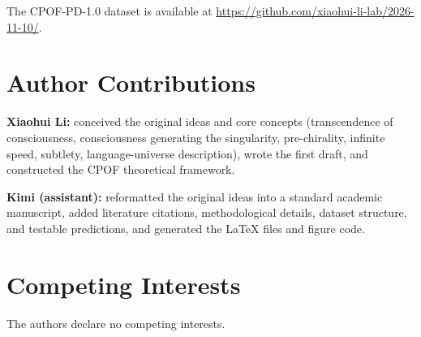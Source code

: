 \documentclass[11pt,a4paper]{article}
\begin{document}
The CPOF-PD-1.0 dataset is available at \url{https://github.com/xiaohui-li-lab/2026-11-10/}.

\section*{Author Contributions}

\textbf{Xiaohui Li:} conceived the original ideas and core concepts (transcendence of consciousness, consciousness generating the singularity, pre-chirality, infinite speed, subtlety, language-universe description), wrote the first draft, and constructed the CPOF theoretical framework.

\textbf{Kimi (assistant):} reformatted the original ideas into a standard academic manuscript, added literature citations, methodological details, dataset structure, and testable predictions, and generated the LaTeX files and figure code.

\section*{Competing Interests}

The authors declare no competing interests.
\end{document}
